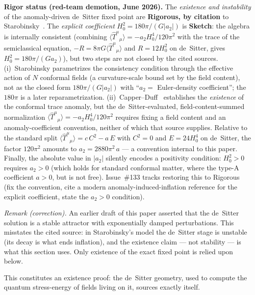 \documentclass[12pt,a4paper]{article}
\begin{document}
\smallskip\noindent\textbf{Rigor status (red-team demotion, June 2026).} The
\emph{existence and instability} of the anomaly-driven de~Sitter fixed point are
\textbf{Rigorous, by citation} to Starobinsky~\cite{starobinsky}. The \emph{explicit
coefficient} $H_0^2 = 180\pi/(G|a_2|)$ is \textbf{Sketch}: the algebra is internally
consistent (combining $\langle\hat{T}^\mu{}_\mu\rangle = -a_2 H_0^4/120\pi^2$ with the
trace of the semiclassical equation, $-R = 8\pi G\langle\hat{T}^\mu{}_\mu\rangle$ and
$R = 12H_0^2$ on de~Sitter, gives $H_0^2 = 180\pi/(Ga_2)$), but two steps are not closed
by the cited sources. (i)~Starobinsky parametrizes the consistency condition through the
effective action of $N$ conformal fields (a curvature-scale bound set by the field content),
not as the closed form $180\pi/(G|a_2|)$ with ``$a_2 = $ Euler-density coefficient'';
the $180\pi$ is a later reparametrization. (ii)~Capper--Duff~\cite{capper_duff} establishes
the \emph{existence} of the conformal trace anomaly, but the de~Sitter-evaluated,
field-content-summed normalization $\langle\hat{T}^\mu{}_\mu\rangle = -a_2 H_0^4/120\pi^2$
requires fixing a field content and an anomaly-coefficient convention, neither of which that
source supplies. Relative to the standard split $\langle\hat{T}^\mu{}_\mu\rangle =
c\,C^2 - a\,E$ with $C^2 = 0$ and $E = 24H_0^4$ on de~Sitter, the factor $120\pi^2$ amounts
to $a_2 = 2880\pi^2\,a$ --- a convention internal to this paper. Finally, the absolute value
in $|a_2|$ silently encodes a positivity condition: $H_0^2 > 0$ requires $a_2 > 0$ (which
holds for standard conformal matter, where the type-A coefficient $a > 0$, but is not free).
Issue~\#133 tracks restoring this to Rigorous (fix the convention, cite a modern
anomaly-induced-inflation reference for the explicit coefficient, state the $a_2 > 0$
condition).

\smallskip\noindent\emph{Remark (correction).} An earlier draft of this paper asserted
that the de~Sitter solution is a stable attractor with exponentially damped perturbations.
This misstates the cited source: in Starobinsky's model the de~Sitter stage is unstable
(its decay is what ends inflation), and the existence claim --- not stability --- is what
this section uses. Only existence of the exact fixed point is relied upon below.

This constitutes an existence proof: the de~Sitter geometry, used to compute the quantum
stress-energy of fields living on it, sources exactly itself.

\end{document}
